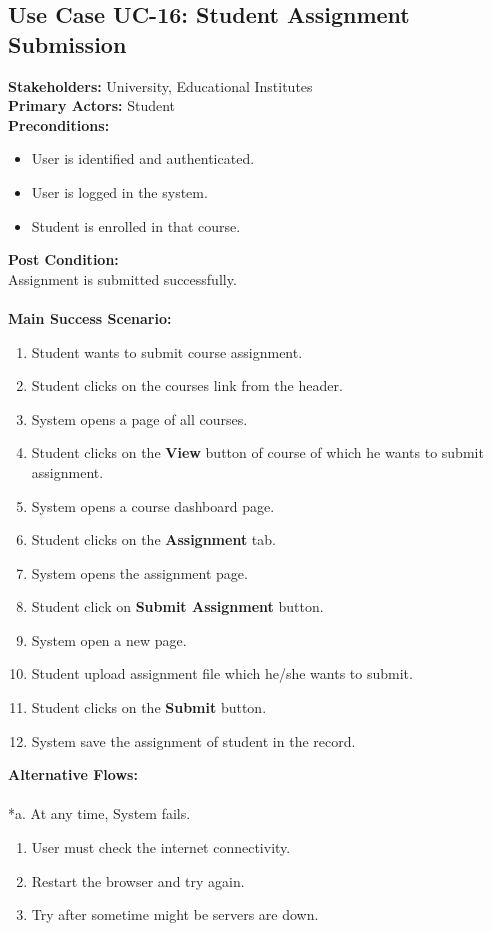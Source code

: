 \subsection{Use Case UC-16: Student Assignment Submission}
\textbf{Stakeholders: } University, Educational Institutes \\
\textbf{Primary Actors: }Student \\
\textbf{Preconditions:}
\begin{itemize}
\item User is identified and authenticated.
\item User is logged in the system.
\item Student is enrolled in that course.
\end{itemize}
\textbf{Post Condition: }\\
Assignment is submitted successfully.\\
\\
\textbf{Main Success Scenario:}
\begin{enumerate}
\item Student wants to submit course assignment.
\item Student clicks on the courses link from the header.
\item System opens a page of all courses.
\item Student clicks on the \textbf{View} button of course of which he wants to submit assignment.
\item System opens a course dashboard page.
\item Student clicks on the \textbf{Assignment} tab.
\item System opens the assignment page.
\item Student click on \textbf{Submit Assignment} button.
\item System open a new page.
\item Student upload assignment file which he/she wants to submit.
\item Student clicks on the \textbf{Submit} button.
\item System save the assignment of student in the record.
\end{enumerate}
\textbf{Alternative Flows:}\\
\\
*a. At any time, System fails.
\begin{enumerate}
\item User must check the internet connectivity.
\item Restart the browser and try again.
\item Try after sometime might be servers are down.
\end{enumerate}
